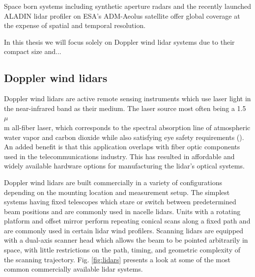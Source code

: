 Space born systems including synthetic aperture radars and the recently launched ALADIN lidar profiler on ESA's ADM-Aeolus satellite offer global coverage at the expense of spatial and temporal resolution.



In this thesis we will focus solely on Doppler wind lidar systems due to their compact size and...

\clearpage
\subsection{Doppler wind lidars}
\label{sec:intro_lidar}

Doppler wind lidars are active remote sensing instruments which use laser light in the near-infrared band as their medium. The laser source most often being a 1.5 $\mu$\\m all-fiber laser, which corresponds to the spectral absorption line of atmospheric water vapor and carbon dioxide while also satisfying eye safety requirements (\cite{cariou_laser_2006}). An added benefit is that this application overlaps with fiber optic components used in the telecommunications industry. This has resulted in affordable and widely available hardware options for manufacturing the lidar's optical systems.

Doppler wind lidars are built commercially in a variety of configurations depending on the mounting location and measurement setup. The simplest systems having fixed telescopes which stare or switch between predetermined beam positions and are commonly used in nacelle lidars. Units with a rotating platform and offset mirror perform repeating conical scans along a fixed path and are commonly used in certain lidar wind profilers. Scanning lidars are equipped with a dual-axis scanner head which allows the beam to be pointed arbitrarily in space, with little restrictions on the path, timing, and geometric complexity of the scanning trajectory. Fig. \ref{fig:lidars} presents a look at some of the most common commercially available lidar systems.

